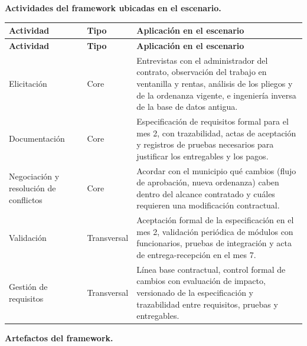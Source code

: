 \documentclass[12pt,a4paper]{article}
\begin{document}
\textbf{Actividades del framework ubicadas en el escenario.}

{\small
\setlength{\tabcolsep}{4pt}
\renewcommand{\arraystretch}{1.3}
\begin{longtable}{
|>{\raggedright\arraybackslash}p{}
|>{\raggedright\arraybackslash}p{}
|>{\raggedright\arraybackslash}p{}|}
\hline
\textbf{Actividad} & \textbf{Tipo} & \textbf{Aplicación en el escenario} \\
\hline
\endfirsthead
\hline
\textbf{Actividad} & \textbf{Tipo} & \textbf{Aplicación en el escenario} \\
\hline
\endhead
Elicitación & Core & Entrevistas con el administrador del contrato, observación del trabajo en ventanilla y rentas, análisis de los pliegos y de la ordenanza vigente, e ingeniería inversa de la base de datos antigua. \\
\hline
Documentación & Core & Especificación de requisitos formal para el mes 2, con trazabilidad, actas de aceptación y registros de pruebas necesarios para justificar los entregables y los pagos. \\
\hline
Negociación y resolución de conflictos & Core & Acordar con el municipio qué cambios (flujo de aprobación, nueva ordenanza) caben dentro del alcance contratado y cuáles requieren una modificación contractual. \\
\hline
Validación & Transversal & Aceptación formal de la especificación en el mes 2, validación periódica de módulos con funcionarios, pruebas de integración y acta de entrega-recepción en el mes 7. \\
\hline
Gestión de requisitos & Transversal & Línea base contractual, control formal de cambios con evaluación de impacto, versionado de la especificación y trazabilidad entre requisitos, pruebas y entregables. \\
\hline
\end{longtable}
}

\textbf{Artefactos del framework.}
\end{document}
